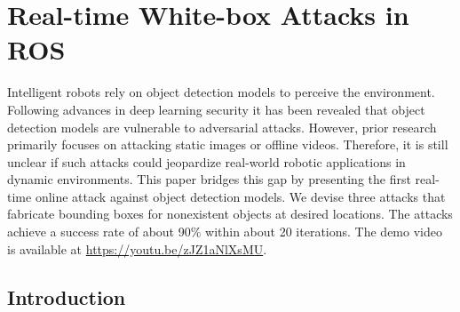 



\section{Real-time White-box Attacks in ROS}
\label{sec:adv_detect}

Intelligent robots rely on object detection models to perceive the environment. Following advances in deep learning security it has been revealed that object detection models are vulnerable to adversarial attacks. However, prior research primarily focuses on attacking static images or offline videos. Therefore, it is still unclear if such attacks could jeopardize real-world robotic applications in dynamic environments. This paper bridges this gap by presenting the first real-time online attack against object detection models. We devise three attacks that fabricate bounding boxes for nonexistent objects at desired locations. The attacks achieve a success rate of about 90\% within about 20 iterations. The demo video is available at \href{https://youtu.be/zJZ1aNlXsMU}{https://youtu.be/zJZ1aNlXsMU}.


\subsection{Introduction}

